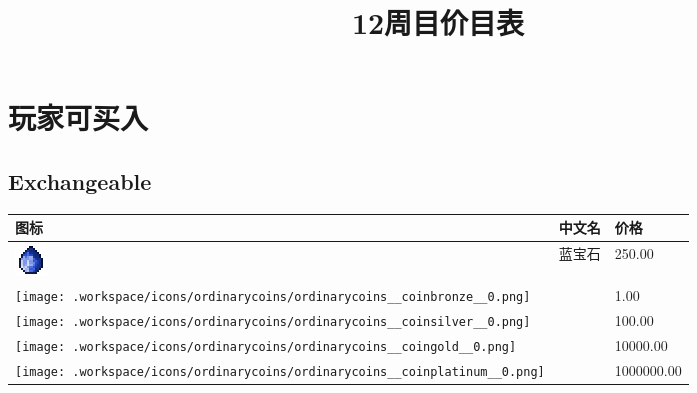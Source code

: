 \documentclass[UTF8]{ctexart}
\title{12周目价目表}
\begin{document}
{}
\maketitle

\section{玩家可买入}

\subsection{Exchangeable}
\begin{longtable}[]{|p{1cm}|p{8cm}|p{1.5cm}|}
\toprule
图标 & 中文名 & 价格\\
\midrule
	\includegraphics{.workspace/icons/iceandfire/iceandfire__sapphire_gem__0.png} & 蓝宝石 &250.00\\
	\hline
	\texttt{[image: .workspace/icons/ordinarycoins/ordinarycoins\_\_coinbronze\_\_0.png]} &  &1.00\\
	\hline
	\texttt{[image: .workspace/icons/ordinarycoins/ordinarycoins\_\_coinsilver\_\_0.png]} &  &100.00\\
	\hline
	\texttt{[image: .workspace/icons/ordinarycoins/ordinarycoins\_\_coingold\_\_0.png]} &  &10000.00\\
	\hline
	\texttt{[image: .workspace/icons/ordinarycoins/ordinarycoins\_\_coinplatinum\_\_0.png]} &  &1000000.00\\
	\hline

\end{longtable}
\end{document}
